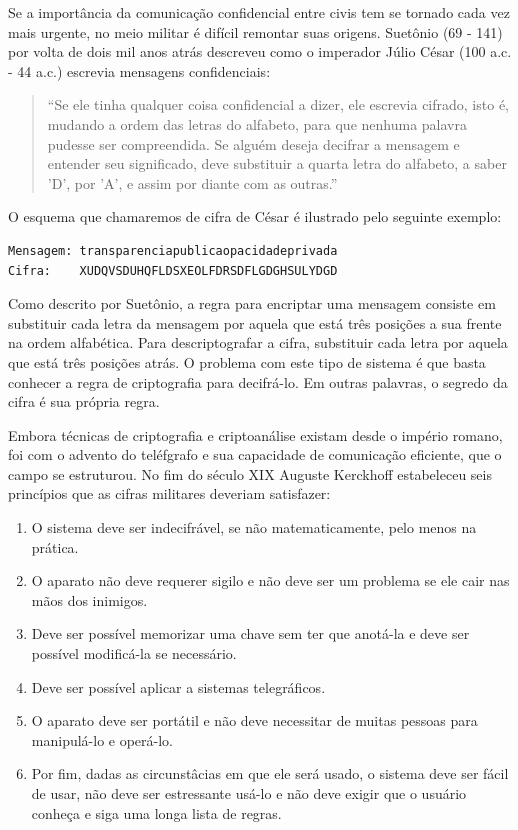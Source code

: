 Se a importância da comunicação confidencial entre civis tem se tornado cada vez mais urgente, no meio militar é difícil remontar suas origens.
Suetônio (69 - 141) por volta de dois mil anos atrás descreveu como o imperador Júlio César (100 a.c. - 44 a.c.) escrevia mensagens confidenciais:


\begin{quote}
  ``Se ele tinha qualquer coisa confidencial a dizer, ele escrevia cifrado, isto é, mudando a ordem das letras do alfabeto, para que nenhuma palavra pudesse ser compreendida.
  Se alguém deseja decifrar a mensagem e entender seu significado, deve substituir a quarta letra do alfabeto, a saber 'D', por 'A', e assim por diante com as outras.''
\end{quote}

O esquema que chamaremos de cifra de César é ilustrado pelo seguinte exemplo:

\begin{verbatim}
Mensagem: transparenciapublicaopacidadeprivada
Cifra:    XUDQVSDUHQFLDSXEOLFDRSDFLGDGHSULYDGD
\end{verbatim}

Como descrito por Suetônio, a regra para encriptar uma mensagem consiste em substituir cada letra da mensagem por aquela que está três posições a sua frente na ordem alfabética.
Para descriptografar a cifra, substituir cada letra por aquela que está três posições atrás.
O problema com este tipo de sistema é que basta conhecer a regra de criptografia para decifrá-lo.
Em outras palavras, o segredo da cifra é sua própria regra.

Embora técnicas de criptografia e criptoanálise existam desde o império romano, foi com o advento do teléfgrafo e sua capacidade de comunicação eficiente, que o campo se estruturou.
No fim do século XIX Auguste Kerckhoff estabeleceu seis princípios que as cifras militares deveriam satisfazer:
\begin{enumerate}
\item O sistema deve ser indecifrável, se não matematicamente, pelo menos na prática.
\item O aparato não deve requerer sigilo e não deve ser um problema se ele cair nas mãos dos inimigos.
\item Deve ser possível memorizar uma chave sem ter que anotá-la e deve ser possível modificá-la se necessário.
\item Deve ser possível aplicar a sistemas telegráficos.
\item O aparato deve ser portátil e não deve necessitar de muitas pessoas para manipulá-lo e operá-lo.
\item Por fim, dadas as circunstâcias em que ele será usado, o sistema deve ser fácil de usar, não deve ser estressante usá-lo e não deve exigir que o usuário conheça e siga uma longa lista de regras.
\end{enumerate}

